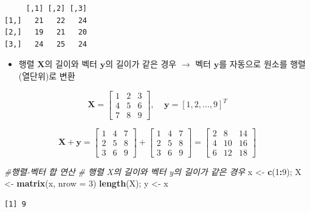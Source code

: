\documentclass[
  11pt,
]{krantz}
\newenvironment{Shaded}{\begin{snugshade}}{\end{snugshade}}
\newcommand{\CommentTok}[1]{\textcolor[rgb]{0.37,0.37,0.37}{\textit{#1}}}
\newcommand{\DataTypeTok}[1]{\textcolor[rgb]{0.27,0.27,0.27}{#1}}
\newcommand{\DecValTok}[1]{\textcolor[rgb]{0.06,0.06,0.06}{#1}}
\newcommand{\KeywordTok}[1]{\textcolor[rgb]{0.27,0.27,0.27}{\textbf{#1}}}
\newcommand{\NormalTok}[1]{#1}
\newcommand{\OperatorTok}[1]{\textcolor[rgb]{0.43,0.43,0.43}{\textbf{#1}}}
\newcommand{\StringTok}[1]{\textcolor[rgb]{0.5,0.5,0.5}{#1}}
\providecommand{\tightlist}{%
  \setlength{\itemsep}{0pt}\setlength{\parskip}{0pt}}
\begin{document}
\begin{verbatim}
     [,1] [,2] [,3]
[1,]   21   22   24
[2,]   19   21   20
[3,]   24   25   24
\end{verbatim}

\normalsize

\begin{itemize}
\tightlist
\item
  행렬 \(\mathrm{\mathbf{X}}\)의 길이와 벡터 \(\mathrm{\mathbf y}\)의 길이가 같은 경우 \(\rightarrow\) 벡터 \(\mathrm{\mathbf y}\)를 자동으로 원소를 행렬(열단위)로 변환
\end{itemize}

\[\mathrm{\mathbf{X}} = 
\begin{bmatrix}
1 & 2 & 3\\
4 & 5 & 6\\
7 & 8 & 9
\end{bmatrix}, ~~~~~
\mathrm{\mathbf y} = [1, 2, \ldots, 9]^T
\]

\[\mathrm{\mathbf{X}} + \mathrm{\mathbf{y}} = 
\begin{bmatrix}
1 & 4 & 7\\
2 & 5 & 8\\
3 & 6 & 9
\end{bmatrix} + 
\begin{bmatrix}
1 & 4 & 7\\
2 & 5 & 8\\
3 & 6 & 9
\end{bmatrix} = 
\begin{bmatrix}
2 &  8  & 14\\
4 &  10 & 16\\
6 &  12 & 18
\end{bmatrix}
\]

\footnotesize

\begin{Shaded}
\begin{Highlighting}[]
\CommentTok{#행렬-벡터 합 연산}
\CommentTok{# 행렬 X의 길이와 벡터 y의 길이가 같은 경우}
\NormalTok{x <-}\StringTok{ }\KeywordTok{c}\NormalTok{(}\DecValTok{1}\OperatorTok{:}\DecValTok{9}\NormalTok{); X <-}\StringTok{ }\KeywordTok{matrix}\NormalTok{(x, }\DataTypeTok{nrow =} \DecValTok{3}\NormalTok{)}
\KeywordTok{length}\NormalTok{(X); y <-}\StringTok{ }\NormalTok{x}
\end{Highlighting}
\end{Shaded}

\begin{verbatim}
[1] 9
\end{verbatim}
\end{document}

